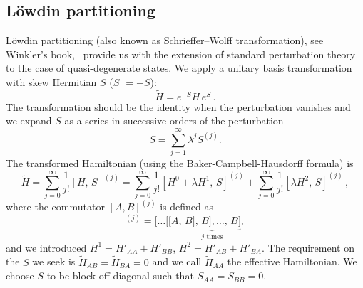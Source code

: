 \documentclass[10pt, onecolumn, aps, prb, superscriptaddress, floatfix, showpacs, notitlepage]{revtex4-1}
\begin{document}
\subsection{L\"owdin partitioning}
\label{sec:lowdin}
L\"owdin partitioning (also known as Schrieffer–Wolff transformation), see Winkler's book,~\cite{winkler} provide us with the extension of standard perturbation theory to the case of quasi-degenerate states.
We apply a unitary basis transformation with skew Hermitian $S$ ($S^\dagger = -S$):
\begin{equation}
\tilde{H} = e^{-S} H \, e^{S}\,.
\end{equation}
The transformation should be the identity when the perturbation vanishes and we expand $S$ as a series in successive orders of the perturbation
\begin{equation}
S = \sum_{j = 1}^{\infty} \lambda^j S^{(j)}.
\end{equation}
The transformed Hamiltonian (using the Baker-Campbell-Hausdorff formula) is
\begin{equation}
\label{eq:lowdin-h}
\tilde{H}
    = \sum_{j=0}^{\infty}\frac{1}{j!} [H,\,S]^{(j)}
    = \sum_{j=0}^{\infty}\frac{1}{j!} [H^0 + \lambda H^1,\,S]^{(j)}
    + \sum_{j=0}^{\infty}\frac{1}{j!} [\lambda H^2,\,S]^{(j)}\,,
\end{equation}
where the commutator $[A, B]^{(j)}$ is defined as
\begin{equation}
[A, B]^{(j)} = [\ldots[[A,\underbrace{\,B],\,B],\ldots,\,B]}_\text{$j$ times},
\end{equation}
and we introduced $H^1 = H'_{AA} + H'_{BB}$, $H^2 = H'_{AB} + H'_{BA}$.
The requirement on the $S$ we seek is $\tilde{H}_{AB} = \tilde{H}_{BA} = 0$ and we call $\tilde{H}_{AA}$ the effective Hamiltonian.
We choose $S$ to be block off-diagonal such that $S_{AA} = S_{BB} = 0$.
\end{document}
